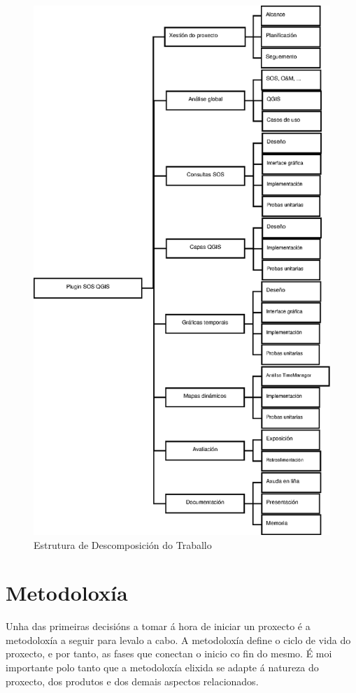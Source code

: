 \begin{figure}[hbtp]
\centering
\includegraphics[height=1.0\textheight]{images/edt.eps}
\caption{Estrutura de Descomposición do Traballo}
\label{fig:edt} 
\end{figure}

\section{Metodoloxía}\label{sec:PlanXestion}
Unha das primeiras decisións a tomar á hora de iniciar un proxecto é a metodoloxía a seguir para levalo a cabo. A metodoloxía define o ciclo de vida do proxecto, e por tanto, as fases que conectan o inicio co fin do mesmo. É moi importante polo tanto que a metodoloxía elixida se adapte á natureza do proxecto, dos produtos e dos demais aspectos relacionados.

